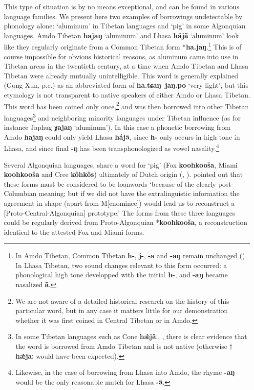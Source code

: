 \documentclass[svgnames,12pt]{scrartcl}
\newcommand{\ipa}[1]{\textbf{{\phon\mbox{#1}}}}
\begin{document}
This type of situation is by no means exceptional, and can be found in various language families. We present here two examples of borrowings undetectable by phonology alone: `aluminum' in Tibetan languages and `pig' in some Algonquian languages. 
Amdo Tibetan \ipa{hajaŋ} `aluminum' and Lhasa \ipa{hájã} `aluminum' look like they regularly originate from a Common Tibetan form *\ipa{ha.jaŋ}.\footnote{In Amdo Tibetan, Common Tibetan \ipa{h-}, \ipa{j-}, \ipa{-a} and \ipa{-aŋ} remain unchanged (\citealt{gong16amdo}). In Lhasa Tibetan, two sound changes relevant to this form occurred: a phonological high tone developped with the initial \ipa{h-}, and \ipa{-aŋ} became nasalized \ipa{ã}.} This is of course impossible for obvious historical reasons, as aluminum came into use in Tibetan areas in the twentieth century, at a time when Amdo Tibetan and Lhasa Tibetan were already mutually unintelligible. This word is generally explained (Gong Xun, p.c.) as an abbreviated form of \ipa{ha.tɕaŋ jaŋ.po} `very light', but this etymology is not transparent to native speakers of either Amdo or Lhasa Tibetan. This word has been coined only once,\footnote{We are not aware of a detailed historical research on the history of this particular word, but in any case it matters little for our demonstration whether it was first coined in Central Tibetan or in Amdo.} and was then borrowed into other Tibetan languages\footnote{In some Tibetan languages such as Cone \ipa{hæ̀jãː}, \citet[306]{jacques14cone}, there is clear evidence that the word is borrowed from Amdo Tibetan and is not native (otherwise $\dagger$\ipa{hæ̀jaː} would have been expected). } and neighboring minority languages under Tibetan influence (as for instance Japhug \ipa{χajaŋ} `aluminum').
In this case a phonetic borrowing from Amdo \ipa{hajaŋ} could only yield Lhasa \ipa{hájã}, since \ipa{h-} only occurs in high tone in Lhasa, and since final \ipa{-ŋ} has been transphonologized as vowel nasality.\footnote{Likewise, in the case of borrowing from Lhasa into Amdo, the rhyme \ipa{-aŋ} would be the only reasonable match for Lhasa \ipa{-ã}.} 

Several Algonquian languages, share a word for `pig' (Fox \ipa{koohkooša}, Miami \ipa{koohkooša} and Cree \ipa{kôhkôs}) ultimately of Dutch origin (\citealt{goddard74dutch}, \citealt{costa13borrowing}). \citet[266]{hockett57k} pointed out that these forms must be considered to be loanwords `because of the clearly post-Columbian meaning; but if we did not have the extralinguistic information the agreement in shape (apart from M[enominee]) would lead us to reconstruct a [Proto-Central-Algonquian] prototype.' The forms from these three languages could be regularly derived from Proto-Algonquian *\ipa{koohkooša}, a reconstruction identical to the attested Fox and Miami forms.
\end{document}
